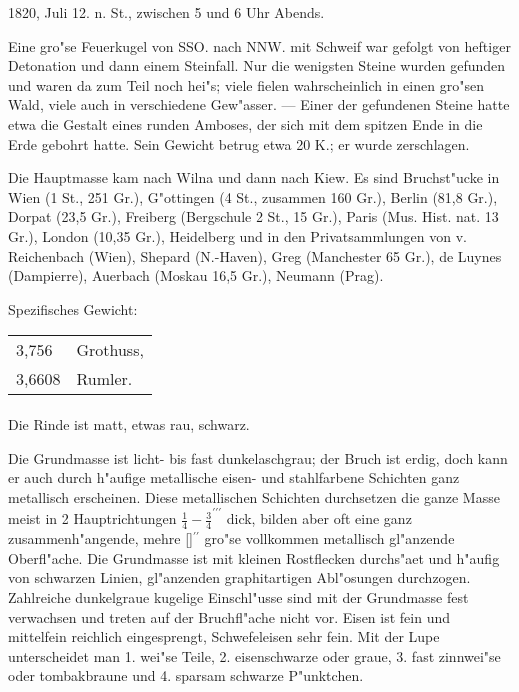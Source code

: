 \documentclass[a4paper, 11pt, oneside]{article}
\begin{document}
1820, Juli 12. n. St., zwischen 5 und 6 Uhr Abends.

Eine gro"se Feuerkugel von SSO. nach NNW. mit Schweif war gefolgt von heftiger Detonation und dann einem Steinfall. Nur die wenigsten Steine wurden gefunden und waren da zum Teil noch hei"s; viele fielen wahrscheinlich in einen gro"sen Wald, viele auch in verschiedene Gew"asser. --- Einer der gefundenen Steine hatte etwa die Gestalt eines runden Amboses, der sich mit dem spitzen Ende in die Erde gebohrt hatte. Sein Gewicht betrug etwa 20 K.; er wurde zerschlagen.

Die Hauptmasse kam nach Wilna und dann nach Kiew. Es sind Bruchst"ucke in Wien (1 St., 251 Gr.), G"ottingen (4 St., zusammen 160 Gr.), Berlin (81,8 Gr.), Dorpat (23,5 Gr.), Freiberg (Bergschule 2 St., 15 Gr.), Paris (Mus. Hist. nat. 13 Gr.), London (10,35 Gr.), Heidelberg und in den Privatsammlungen von v. Reichenbach (Wien), Shepard (N.-Haven), Greg (Manchester 65 Gr.), de Luynes (Dampierre), Auerbach (Moskau 16,5 Gr.), Neumann (Prag).

Spezifisches Gewicht:
\begin{table}[!ht]
    \centering
    \begin{tabular}{l l}
        3,756 & Grothuss,\\
        3,6608 & Rumler.
    \end{tabular}
\end{table}
\paragraph{}
Die Rinde ist matt, etwas rau, schwarz.

Die Grundmasse ist licht- bis fast dunkelaschgrau; der Bruch ist erdig, doch kann er auch durch h"aufige metallische eisen- und stahlfarbene Schichten ganz metallisch erscheinen. Diese metallischen Schichten durchsetzen die ganze Masse meist in 2 Hauptrichtungen $\frac{1}{4}-\frac{3}{4}^{\prime\prime\prime}$ dick, bilden aber oft eine ganz zusammenh"angende, mehre []$^{\prime\prime}$ gro"se vollkommen metallisch gl"anzende Oberfl"ache. Die Grundmasse ist mit kleinen Rostflecken durchs"aet und h"aufig von schwarzen Linien, gl"anzenden graphitartigen Abl"osungen durchzogen. Zahlreiche dunkelgraue kugelige Einschl"usse sind mit der Grundmasse fest verwachsen und treten auf der Bruchfl"ache nicht vor. Eisen ist fein und mittelfein reichlich eingesprengt, Schwefeleisen sehr fein. Mit der Lupe unterscheidet man 1. wei"se Teile, 2. eisenschwarze oder graue, 3. fast zinnwei"se oder tombakbraune und 4. sparsam schwarze P"unktchen.
\end{document}
